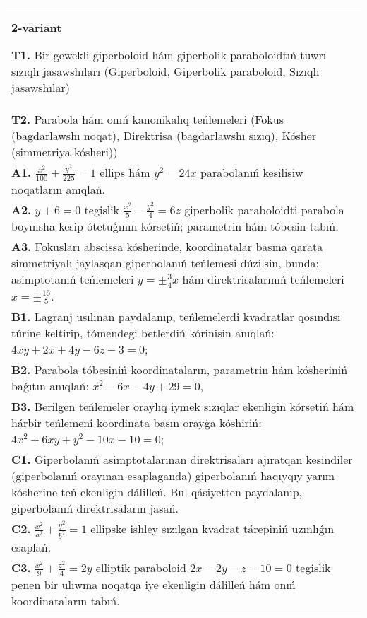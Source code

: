 \documentclass{article}
\begin{document}
\begin{tabular}{m{17cm}}
\textbf{2-variant}
\newline

\textbf{T1.} Bir gewekli giperboloid hám giperbolik paraboloidtıń tuwrı sızıqlı jasawshıları (Giperboloid, Giperbolik paraboloid, Sızıqlı jasawshılar) \\
\textbf{T2.} Parabola hám onıń kanonikalıq teńlemeleri (Fokus (bagdarlawshı noqat), Direktrisa (bagdarlawshı sızıq), Kósher (simmetriya kósheri)) \\
\textbf{A1.} $\frac{x^2}{100}+\frac{y^2}{225}=1$ ellips hám $y^2=24 x$ parabolanıń kesilisiw noqatların anıqlań. \\
\textbf{A2.} $y+6=0$ tegislik $\frac{x^2}{5}-\frac{y^2}{4}=6 z$ giperbolik paraboloidti parabola boyınsha kesip ótetuģının kórsetiń; parametrin hám tóbesin tabıń. \\
\textbf{A3.} Fokusları abscissa kósherinde, koordinatalar basına qarata simmetriyalı jaylasqan giperbolanıń teńlemesi dúzilsin, bunda: asimptotanıń teńlemeleri $y= \pm \frac{3}{4} x$ hám direktrisalarınıń teńlemeleri $x= \pm \frac{16}{5}$. \\
\textbf{B1.} Lagranj usılınan paydalanıp, teńlemelerdi kvadratlar qosındısı túrine keltirip, tómendegi betlerdiń kórinisin anıqlań: $4 x y+2 x+4 y-6 z-3=0$; \\
\textbf{B2.} Parabola tóbesiniń koordinataların, parametrin hám kósheriniń baǵıtın anıqlań: $x^2-6 x-4 y+29=0$, \\
\textbf{B3.} Berilgen teńlemeler oraylıq iymek sızıqlar ekenligin kórsetiń hám hárbir teńlemeni koordinata basın orayģa kóshiriń: $4 x^2+6 x y+y^2-10 x-10=0$; \\
\textbf{C1.} Giperbolanıń asimptotalarınan direktrisaları ajıratqan kesindiler (giperbolanıń orayınan esaplaganda) giperbolanıń haqıyqıy yarım kósherine teń ekenligin dálilleń. Bul qásiyetten paydalanıp, giperbolanıń direktrisaların jasań. \\
\textbf{C2.} $\frac{x^2}{a^2}+\frac{y^2}{b^2}=1$ ellipske ishley sızılgan kvadrat tárepiniń uzınlıǵın esaplań. \\
\textbf{C3.} $\frac{x^2}{9}+\frac{z^2}{4}=2 y$ elliptik paraboloid $2 x-2 y-z-10=0$ tegislik penen bir ulıwma noqatqa iye ekenligin dálilleń hám onıń koordinataların tabıń. \\

\end{tabular}
\vspace{1cm}
\end{document}
